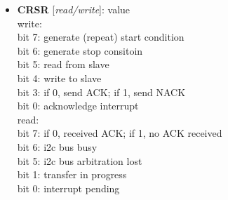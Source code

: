 \vspace{12pt}
\noindent
{}

\begin{itemize}
\item \begin{small}
{\bf 
CRSR
} [\emph{read/write}]: value
\\
 write: \\                        bit 7: generate (repeat) start condition \\                        bit 6: generate stop consitoin \\                        bit 5: read from slave \\                        bit 4: write to slave \\                        bit 3: if 0, send ACK; if 1, send NACK \\                        bit 0: acknowledge interrupt \\                      read: \\                        bit 7: if 0, received ACK; if 1, no ACK received \\                        bit 6: i2c bus busy \\                        bit 5: i2c bus arbitration lost \\                        bit 1: transfer in progress \\                        bit 0: interrupt pending
\end{small}
\end{itemize}
